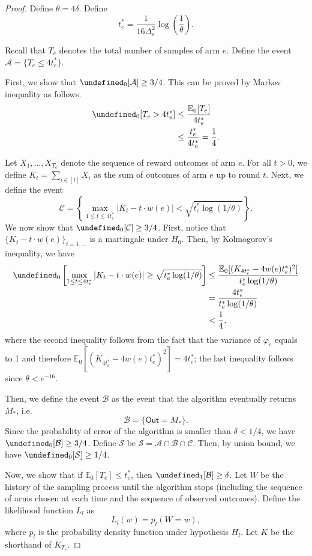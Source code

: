 \documentclass{article}
\newcommand{\Rew}{\varphi}
\newcommand{\E}{\mathbb E}
\newcommand{\out}{\mathsf{Out}}
\let\Pr\undefined
\DeclareMathOperator{\Pr}{Pr}
\begin{document}
\begin{proof}
Define $\theta=4\delta$. Define
\begin{equation}
t_e^* = \frac{1}{16\Delta^2_e}\log\left(\frac{1}{\theta}\right).
\label{eq:define-tstar}
\end{equation}

Recall that $T_e$ denotes the total number of samples of arm $e$.
Define the event
$\mathcal A = \{T_e \le 4t_e^* \}$.

First, we show that $\Pr_0[\mathcal A] \ge 3/4$. 
This can be proved by Markov inequality as follows.
\begin{align*}
\Pr_0[T_e > 4t_e^*] &\le \frac{\E_0[T_e]}{4t_e^*} \\
					  &\le \frac{t_e^*}{4t_e^*} = \frac14.
\end{align*}

Let $X_1,\ldots,X_{T_e}$ denote the sequence of reward outcomes of arm $e$.
For all $t>0$, we define $K_t= \sum_{i\in [t]} X_i$ as the sum of outcomes of arm $e$ up to round $t$.
Next, we define the event 
$$
\mathcal C=\left\{\max_{1\le t \le 4t_e^*} \left|K_t-t\cdot w(e)\right|  < \sqrt{t_e^*\log(1/\theta)} \right\}.
$$
We now show that $\Pr_0[\mathcal C] \ge 3/4$.
First, notice that $\{K_t-t\cdot w(e)\}_{t=1,\ldots}$ is a martingale under $H_0$.
Then, by Kolmogorov's inequality, we have
\begin{align*}
\Pr_0\left[\max_{1\le t \le 4t_e^*} \left|K_t-t\cdot w(e)\right| \ge \sqrt{t_e^*\log(1/\theta)} \right]
&\le \frac{\E_0[ (K_{4t_e^*}-4w(e)t_e^*)^2]}{t_e^*\log(1/\theta)}\\
&= \frac{4t_e^*}{t_e^*\log(1/\theta)}\\
&< \frac14,
\end{align*}
where the second inequality follows from the fact that the variance of $\Rew_e$ equals to 1 and therefore $\E_0[(K_{4t_e^*}-4w(e)t_e^*)^2] = 4t_e^*$; the last inequality follows 
since $\theta < e^{-16}$.

Then, we define the event $\mathcal B$ as the event that the algorithm eventually returns $M_*$, i.e.
$$
\mathcal B=\{\out=M_*\}.
$$
Since the probability of error of the algorithm is smaller than $\delta < 1/4$, we have $\Pr_0[\mathcal B] \ge 3/4$.
Define $\mathcal S$ be $\mathcal S=\mathcal A\cap \mathcal B \cap \mathcal C$. 
Then, by union bound, we have $\Pr_0[\mathcal S]\ge 1/4$.

Now, we show that if $\E_0[T_e] \le t_e^*$, then $\Pr_1[\mathcal B] \ge \delta$.
Let $W$ be the history of the sampling process until the algorithm stops (including the sequence of arms chosen at each time and the sequence of observed outcomes).
Define the likelihood function $L_l$ as 
$$
L_l(w) = p_l(W=w),
$$
where $p_l$ is the probability density function under hypothesis $H_l$.
Let $K$ be the shorthand of $K_{T_e}$.


\end{proof}
\end{document}
